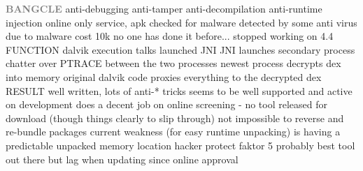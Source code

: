\newline\newline\textbf{\textcolor{gray}{BANGCLE}}\newline
anti-debugging\newline
anti-tamper\newline
anti-decompilation\newline
anti-runtime injection\newline
online only service, apk checked for malware\newline
detected by some anti virus due to malware\newline
cost 10k\newline
no one has done it before...\newline
stopped working on 4.4\newline
FUNCTION\newline
dalvik execution talks launched JNI\newline
JNI launches secondary process\newline
chatter over PTRACE between the two processes\newline
newest process decrypts dex into memory\newline
original dalvik code proxies everything to the decrypted dex\newline
RESULT\newline
well written, lots of anti-* tricks\newline
seems to be well supported and active on development\newline
does a decent job on online screening - no tool released for download (though things clearly to slip through)\newline
not impossible to reverse and re-bundle packages\newline
current weakness (for easy runtime unpacking) is having a predictable unpacked memory location\newline
hacker protect faktor 5\newline
probably best tool out there but lag when updating since online approval\newline
